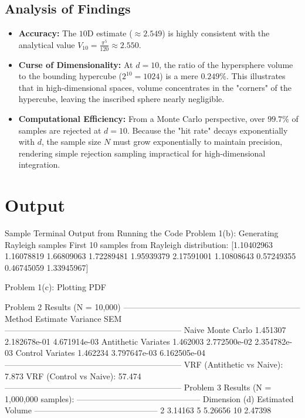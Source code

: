 \documentclass{article}
\begin{document}
\subsection*{Analysis of Findings}

\begin{itemize}
    \item \textbf{Accuracy:} The $10$D estimate ($\approx 2.549$) is highly consistent with the analytical value $V_{10} = \frac{\pi^5}{120} \approx 2.550$.
    \item \textbf{Curse of Dimensionality:} At $d=10$, the ratio of the hypersphere volume to the bounding hypercube ($2^{10} = 1024$) is a mere $0.249\%$. This illustrates that in high-dimensional spaces, volume concentrates in the "corners" of the hypercube, leaving the inscribed sphere nearly negligible.
    \item \textbf{Computational Efficiency:} From a Monte Carlo perspective, over $99.7\%$ of samples are rejected at $d=10$. Because the "hit rate" decays exponentially with $d$, the sample size $N$ must grow exponentially to maintain precision, rendering simple rejection sampling impractical for high-dimensional integration.
\end{itemize}



\section*{Output }

\begin{outputbox}{Sample Terminal Output from Running the Code}
Problem 1(b): Generating Rayleigh samples
First 10 samples from Rayleigh distribution: [1.10402963 1.16078819 1.66809063 1.72289481 1.95939379 2.17591001
 1.10808643 0.57249355 0.46745059 1.33945967]

Problem 1(c): Plotting PDF

Problem 2 Results (N = 10,000)
-----------------------------------------------------------------
Method                 Estimate     Variance       SEM           
-----------------------------------------------------------------
Naive Monte Carlo      1.451307     2.182678e-01   4.671914e-03   
Antithetic Variates    1.462003     2.772500e-02   2.354782e-03   
Control Variates       1.462234     3.797647e-03   6.162505e-04  
-----------------------------------------------------------------
VRF (Antithetic vs Naive): 7.873
VRF (Control vs Naive):    57.474
-----------------------------------------------------------------
Problem 3 Results (N = 1,000,000 samples):
---------------------------------------------
Dimension (d)   Estimated Volume    
---------------------------------------------
2               3.14163             
5               5.26656             
10              2.47398             
\end{outputbox}
\end{document}
